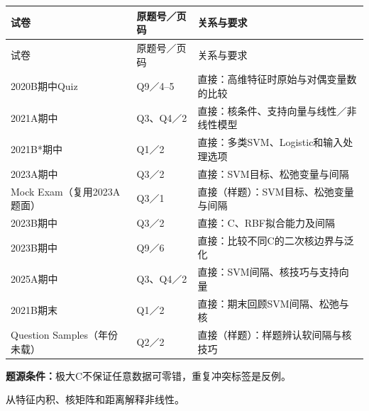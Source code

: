 \begingroup\small\setlength{\tabcolsep}{3pt}\renewcommand{\arraystretch}{1.22}
\begin{longtable}{@{}>{\raggedright\arraybackslash}p{}>{\raggedright\arraybackslash}p{}>{\raggedright\arraybackslash}p{}@{}}
\toprule
试卷 & 原题号／页码 & 关系与要求 \\
\midrule\endfirsthead
试卷 & 原题号／页码 & 关系与要求 \\
\midrule\endhead
\bottomrule\endfoot
2020B期中Quiz & Q9／4–5 & 直接：高维特征时原始与对偶变量数的比较 \\
2021A期中 & Q3、Q4／2 & 直接：核条件、支持向量与线性／非线性模型 \\
2021B*期中 & Q1／2 & 直接：多类SVM、Logistic和输入处理选项 \\
2023A期中 & Q3／2 & 直接：SVM目标、松弛变量与间隔 \\
Mock Exam（复用2023A题面） & Q3／1 & 直接（样题）：SVM目标、松弛变量与间隔 \\
2023B期中 & Q3／2 & 直接：C、RBF拟合能力及间隔 \\
2023B期中 & Q9／6 & 直接：比较不同C的二次核边界与泛化 \\
2025A期中 & Q3、Q4／2 & 直接：SVM间隔、核技巧与支持向量 \\
2021B期末 & Q1／2 & 直接：期末回顾SVM间隔、松弛与核 \\
Question Samples（年份未载） & Q2／2 & 直接（样题）：样题辨认软间隔与核技巧 \\
\end{longtable}\endgroup

\textbf{题源条件：}极大C不保证任意数据可零错，重复冲突标签是反例。



从特征内积、核矩阵和距离解释非线性。


